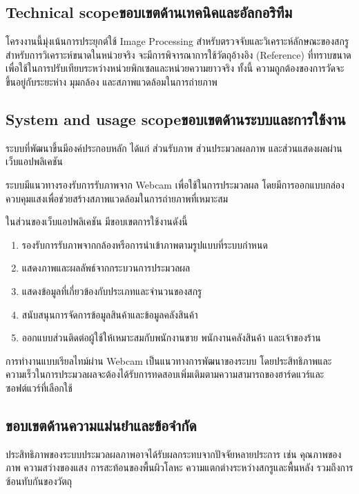 \subsection{\ifenglish Technical scope\else ขอบเขตด้านเทคนิคและอัลกอริทึม\fi}

โครงงานนี้มุ่งเน้นการประยุกต์ใช้ Image Processing สำหรับตรวจจับและวิเคราะห์ลักษณะของสกรู สำหรับการวิเคราะห์ขนาดในหน่วยจริง จะมีการพิจารณาการใช้วัตถุอ้างอิง (Reference) ที่ทราบขนาด เพื่อใช้ในการปรับเทียบระหว่างหน่วยพิกเซลและหน่วยความยาวจริง ทั้งนี้ ความถูกต้องของการวัดจะขึ้นอยู่กับระยะห่าง มุมกล้อง และสภาพแวดล้อมในการถ่ายภาพ \cite{tarmacviewCalibration}

\subsection{\ifenglish System and usage scope\else ขอบเขตด้านระบบและการใช้งาน\fi}

ระบบที่พัฒนาขึ้นมีองค์ประกอบหลัก ได้แก่ ส่วนรับภาพ ส่วนประมวลผลภาพ และส่วนแสดงผลผ่านเว็บแอปพลิเคชัน

ระบบมีแนวทางรองรับการรับภาพจาก Webcam เพื่อใช้ในการประมวลผล โดยมีการออกแบบกล่องควบคุมแสงเพื่อช่วยสร้างสภาพแวดล้อมในการถ่ายภาพที่เหมาะสม

ในส่วนของเว็บแอปพลิเคชัน มีขอบเขตการใช้งานดังนี้

\begin{enumerate}                                        
    \item รองรับการรับภาพจากกล้องหรือการนำเข้าภาพตามรูปแบบที่ระบบกำหนด
    \item แสดงภาพและผลลัพธ์จากกระบวนการประมวลผล
    \item แสดงข้อมูลที่เกี่ยวข้องกับประเภทและจำนวนของสกรู
    \item สนับสนุนการจัดการข้อมูลสินค้าและข้อมูลคลังสินค้า
    \item ออกแบบส่วนติดต่อผู้ใช้ให้เหมาะสมกับพนักงานขาย พนักงานคลังสินค้า และเจ้าของร้าน
\end{enumerate}

การทำงานแบบเรียลไทม์ผ่าน Webcam เป็นแนวทางการพัฒนาของระบบ โดยประสิทธิภาพและความเร็วในการประมวลผลจะต้องได้รับการทดสอบเพิ่มเติมตามความสามารถของฮาร์ดแวร์และซอฟต์แวร์ที่เลือกใช้

\subsection{ขอบเขตด้านความแม่นยำและข้อจำกัด}

ประสิทธิภาพของระบบประมวลผลภาพอาจได้รับผลกระทบจากปัจจัยหลายประการ เช่น คุณภาพของภาพ ความสว่างของแสง การสะท้อนของพื้นผิวโลหะ ความแตกต่างระหว่างสกรูและพื้นหลัง รวมถึงการซ้อนทับกันของวัตถุ


